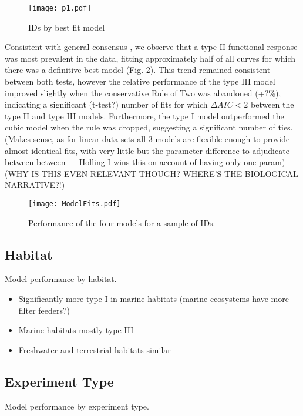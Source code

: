\documentclass[11pt]{article}
\begin{document}
    \begin{figure}[H]
	    \centering\texttt{[image: p1.pdf]}
	    \caption{IDs by best fit model}
    \end{figure}
    
    Consistent with general consensus \parencite{hassell1976components} \parencite{begon1996ecology}, we observe that a type II functional response was most prevalent in the data, fitting approximately half of all curves for which there was a definitive best model (Fig. 2). This trend remained consistent between both tests, however the relative performance of the type III model improved slightly when the conservative Rule of Two was abandoned (+?\%), indicating a significant (t-test?) number of fits for which $\Delta{AIC}<2$ between the type II and type III models. Furthermore, the type I model outperformed the cubic model when the rule was dropped, suggesting a significant number of ties. (Makes sense, as for linear data sets all 3 models are flexible enough to provide almost identical fits, with very little but the parameter difference to adjudicate between between — Holling I wins this on account of having only one param) (WHY IS THIS EVEN RELEVANT THOUGH? WHERE'S THE BIOLOGICAL NARRATIVE?!)
    
    \begin{figure}[H]
	    \centering\texttt{[image: ModelFits.pdf]}
	    \caption{Performance of the four models for a sample of IDs.}
    \end{figure}
    
    \subsection{Habitat}
    \begin{table}[ht!]
        \centering
        \caption{Model performance by habitat.}
    \end{table}
   
    \begin{itemize}
      \item Significantly more type I in marine habitats (marine ecosystems have more filter feeders?)
      \item Marine habitats mostly type III
      \item Freshwater and terrestrial habitats similar
    \end{itemize}
    
    \subsection{Experiment Type}
    \begin{table}[ht!]
        \centering
        \caption{Model performance by experiment type.}
    \end{table}
    
\end{document}

